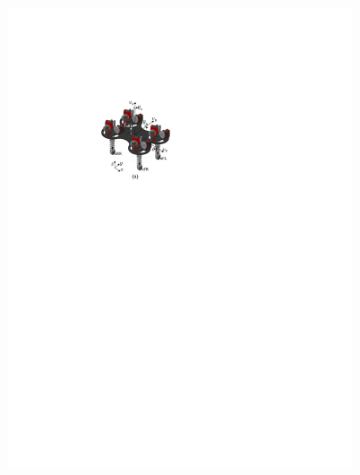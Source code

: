 \begin{figure}[ht]
    \centering
    \begin{subfigure}[b]{0.4\textwidth}
    \centering 
    \includegraphics[width=\linewidth]{img/chap3/robot.pdf}
    \end{subfigure}
    \begin{subfigure}[b]{0.59\textwidth}
    \centering 

\end{subfigure}
\end{figure}
